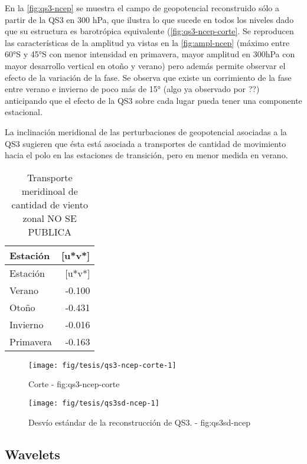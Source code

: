 \documentclass[spanish,a4paper]{book}
\begin{document}
En la \autoref{fig:qs3-ncep} se muestra el campo de geopotencial
reconstruido sólo a partir de la QS3 en 300 hPa, que ilustra lo que
sucede en todos los niveles dado que su estructura es barotrópica
equivalente (\autoref{fig:qs3-ncep-corte}. Se reproducen las
características de la amplitud ya vistas en la \autoref{fig:ampl-ncep}
(máximo entre 60°S y 45°S con menor intensidad en primavera, mayor
amplitud en 300hPa con mayor desarrollo vertical en otoño y verano) pero
además permite observar el efecto de la variación de la fase. Se observa
que existe un corrimiento de la fase entre verano e invierno de poco más
de 15° (algo ya observado por
??)
anticipando que el efecto de la QS3 sobre cada lugar 
pueda tener una componente estacional.

La inclinación meridional de las perturbaciones de geopotencial
asociadas a la QS3 sugieren que ésta está asociada a transportes de
cantidad de movimiento hacia el polo en las estaciones de transición,
pero en menor medida en verano.

\begin{longtable}[]{@{}lr@{}}
\caption{Transporte meridinoal de cantidad de viento zonal NO SE
PUBLICA}\tabularnewline
\toprule
Estación & {[}u*v*{]}\tabularnewline
\midrule
\endfirsthead
\toprule
Estación & {[}u*v*{]}\tabularnewline
\midrule
\endhead
Verano & -0.100\tabularnewline
Otoño & -0.431\tabularnewline
Invierno & -0.016\tabularnewline
Primavera & -0.163\tabularnewline
\bottomrule
\end{longtable}

\begin{figure*}
\texttt{[image: fig/tesis/qs3-ncep-corte-1]} \caption{Corte - fig:qs3-ncep-corte}\label{fig:qs3-ncep-corte}
\end{figure*}

\begin{figure*}
\texttt{[image: fig/tesis/qs3sd-ncep-1]} \caption{Desvío estándar de la reconstrucción de QS3. - fig:qs3sd-ncep}\label{fig:qs3sd-ncep}
\end{figure*}


\subsection{Wavelets}\label{wavelets}
\end{document}
